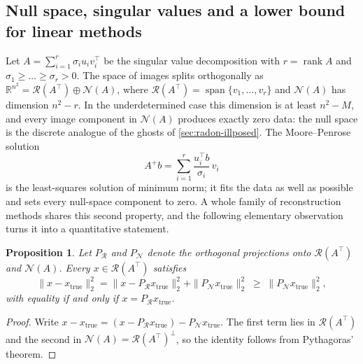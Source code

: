 \documentclass[11pt,a4paper]{article}
\numberwithin{equation}{section}
\newtheorem{proposition}{Proposition}[section]
\theoremstyle{remark}
\DeclareMathOperator{\rank}{rank}
\newcommand{\R}{\mathbb{R}}
\newcommand{\RR}{\mathcal{R}}
\newcommand{\NN}{\mathcal{N}}
\newcommand{\xt}{x_{\mathrm{true}}}
\newcommand{\T}{\top}
\begin{document}
\subsection{Null space, singular values and a lower bound for linear methods}\label{sec:discrete-null}

Let $A=\sum_{i=1}^r\sigma_iu_iv_i^\T$ be the singular value decomposition with $r=\rank A$ and $\sigma_1\ge\dots\ge\sigma_r>0$. The space of images splits orthogonally as $\R^{n^2}=\RR(A^\T)\oplus\NN(A)$, where $\RR(A^\T)=\operatorname{span}\{v_1,\dots,v_r\}$ and $\NN(A)$ has dimension $n^2-r$. In the underdetermined case this dimension is at least $n^2-M$, and every image component in $\NN(A)$ produces exactly zero data: the null space is the discrete analogue of the ghosts of \cref{sec:radon-illposed}. The Moore--Penrose solution
\begin{equation}\label{eq:pinv}
  A^+b=\sum_{i=1}^r\frac{u_i^\T b}{\sigma_i}\,v_i
\end{equation}
is the least-squares solution of minimum norm; it fits the data as well as possible and sets every null-space component to zero. A whole family of reconstruction methods shares this second property, and the following elementary observation turns it into a quantitative statement.

\begin{proposition}\label{prop:bound}
Let $P_{\RR}$ and $P_{\NN}$ denote the orthogonal projections onto $\RR(A^\T)$ and $\NN(A)$. Every $x\in\RR(A^\T)$ satisfies
\begin{equation}\label{eq:bound}
  \|x-\xt\|_2^2=\|x-P_{\RR}\xt\|_2^2+\|P_{\NN}\xt\|_2^2\;\ge\;\|P_{\NN}\xt\|_2^2 ,
\end{equation}
with equality if and only if $x=P_{\RR}\xt$.
\end{proposition}

\begin{proof}
Write $x-\xt=(x-P_{\RR}\xt)-P_{\NN}\xt$. The first term lies in $\RR(A^\T)$ and the second in $\NN(A)=\RR(A^\T)^\perp$, so the identity follows from Pythagoras' theorem.
\end{proof}
\end{document}
